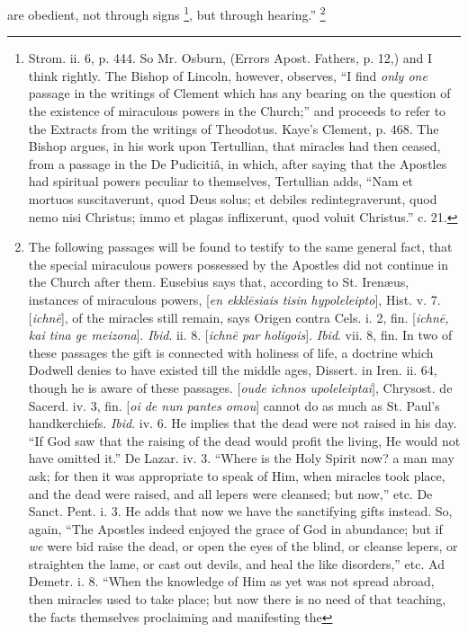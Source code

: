 are obedient, not through signs \footnote{Strom. ii. 6, p. 444. So Mr. Osburn, (Errors
Apost. Fathers, p. 12,) and I think rightly. The Bishop of Lincoln,
however, observes, ``I find \emph{only one} passage in the writings of Clement
which has any bearing on the question of the existence of miraculous
powers in the Church;'' and proceeds to refer to the Extracts from the
writings of Theodotus. Kaye's Clement, p. 468. The Bishop argues, in
his work upon Tertullian, that miracles had then ceased, from a
passage in the De Pudicitiâ, in which, after saying that the Apostles
had spiritual powers peculiar to themselves, Tertullian adds, ``Nam et
mortuos suscitaverunt, quod Deus solus; et debiles redintegraverunt,
quod nemo nisi Christus; immo et plagas inflixerunt, quod voluit
Christus.'' c. 21.}, but through hearing.'' \footnote{The following passages will be found to
testify to the same general fact, that the special miraculous powers
possessed by the Apostles did not continue in the Church after them.
Eusebius says that, according to St. Irenæus, instances of miraculous
powers, [\emph{en ekkl\={e}siais tisin hypoleleipto}], Hist. v. 7.
[\emph{ichn\={e}}], of the miracles still remain, says Origen
contra Cels. i. 2, fin. [\emph{ichn\={e}, kai tina ge meizona}]. \emph{Ibid}.
ii. 8. [\emph{ichn\={e} par holigois}]. \emph{Ibid}. vii. 8, fin.
In two of these passages the gift is connected with holiness of life,
a doctrine which Dodwell denies to have existed till the middle ages,
Dissert. in Iren. ii. 64, though he is aware of these passages. [\emph{oude
ichnos upoleleiptai}], Chrysost. de Sacerd. iv. 3, fin. [\emph{oi de
nun pantes omou}] cannot do as much as St. Paul's handkerchiefs. \emph{Ibid}.
iv. 6. He implies that the dead were not raised in his day. ``If God
saw that the raising of the dead would profit the living, He would not
have omitted it.'' De Lazar. iv. 3. ``Where is the Holy Spirit now? a
man may ask; for then it was appropriate to speak of Him, when
miracles took place, and the dead were raised, and all lepers were
cleansed; but now,'' etc. De Sanct. Pent. i. 3. He adds that now we
have the sanctifying gifts instead. So, again, ``The Apostles indeed
enjoyed the grace of God in abundance; but if \emph{we} were bid raise
the dead, or open the eyes of the blind, or cleanse lepers, or
straighten the lame, or cast out devils, and heal the like disorders,''
etc. Ad Demetr. i. 8. ``When the knowledge of Him as yet was not spread
abroad, then miracles used to take place; but now there is no need of
that teaching, the facts themselves proclaiming and manifesting the
}
